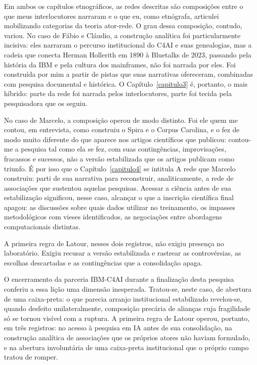 Em ambos os capítulos etnográficos, as redes descritas são composições entre o que meus interlocutores narraram e o que eu, como etnógrafa, articulei mobilizando categorias da teoria ator-rede. O grau dessa composição, contudo, variou. No caso de Fábio e Cláudio, a construção analítica foi particularmente incisiva: eles narraram o percurso institucional do C4AI e suas genealogias, mas a cadeia que conecta Herman Hollerith em 1890 à Bluetalks de 2023, passando pela história da IBM e pela cultura dos mainframes, não foi narrada por eles. Foi construída por mim a partir de pistas que suas narrativas ofereceram, combinadas com pesquisa documental e histórica. O Capítulo~\ref{capitulo3} é, portanto, o mais híbrido: parte da rede foi narrada pelos interlocutores, parte foi tecida pela pesquisadora que os seguiu.

No caso de Marcelo, a composição operou de modo distinto. Foi ele quem me contou, em entrevista, como construiu o Spira e o Corpus Carolina, e o fez de modo muito diferente do que aparece nos artigos científicos que publicou: contou-me a pesquisa tal como ela se fez, com suas contingências, improvisações, fracassos e sucessos, não a versão estabilizada que os artigos publicam como triunfo. É por isso que o Capítulo~\ref{capitulo4} se intitula A rede que Marcelo construiu: parti de sua narrativa para reconstruir, analiticamente, a rede de associações que sustentou aquelas pesquisas. Acessar a ciência antes de sua estabilização significou, nesse caso, alcançar o que a inscrição científica final apagou: as discussões sobre quais dados utilizar no treinamento, os impasses metodológicos com vieses identificados, as negociações entre abordagens computacionais distintas.

A primeira regra de Latour, nesses dois registros, não exigiu presença no laboratório. Exigiu recusar a versão estabilizada e rastrear as controvérsias, as escolhas descartadas e as contingências que a consolidação apaga.

O encerramento da parceria IBM-C4AI durante a finalização desta pesquisa conferiu a essa lição uma dimensão inesperada. Tratou-se, neste caso, de abertura de uma caixa-preta: o que parecia arranjo institucional estabilizado revelou-se, quando desfeito unilateralmente, composição precária de alianças cuja fragilidade só se tornou visível com a ruptura. A primeira regra de Latour operou, portanto, em três registros: no acesso à pesquisa em IA antes de sua consolidação, na construção analítica de associações que os próprios atores não haviam formulado, e na abertura involuntária de uma caixa-preta institucional que o próprio campo tratou de romper.


